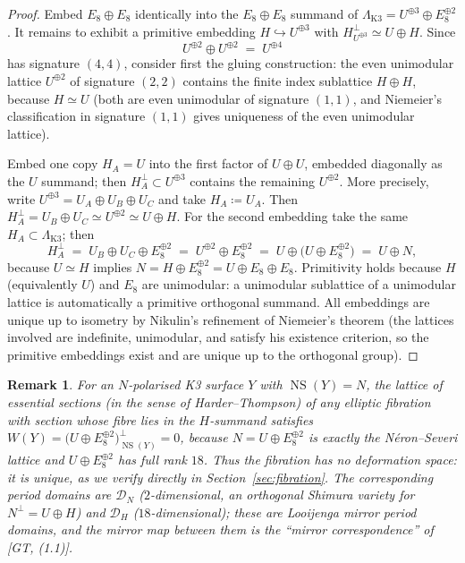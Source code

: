 \documentclass[11pt]{article}
\newtheorem{remark}[theorem]{Remark}
\DeclareMathOperator{\NS}{NS}
\begin{document}
\begin{proof}
Embed $E_8\oplus E_8$ identically into the $E_8\oplus E_8$ summand of
$\Lambda_{\mathrm{K3}}=U^{\oplus3}\oplus E_8^{\oplus2}$. It remains to
exhibit a primitive embedding $H\hookrightarrow U^{\oplus 3}$ with
$H^{\perp}_{U^{\oplus3}}\simeq U\oplus H$. Since
\[
U^{\oplus 2}\oplus U^{\oplus 2}\;=\;U^{\oplus 4}
\]
has signature $(4,4)$, consider first the gluing construction: the even
unimodular lattice $U^{\oplus2}$ of signature $(2,2)$ contains the finite
index sublattice $H\oplus H$, because $H\simeq U$ (both are even unimodular
of signature $(1,1)$, and Niemeier's classification in signature $(1,1)$
gives uniqueness of the even unimodular lattice).


Embed one copy $H_A=U$
into the first factor of $U\oplus U$, embedded diagonally as the $U$
summand; then $H_A^{\perp}\subset U^{\oplus3}$ contains the remaining
$U^{\oplus2}$. More precisely, write
$U^{\oplus3}=U_A\oplus U_B\oplus U_C$ and take
$H_A \coloneqq U_A$. Then
$H_A^{\perp}=U_B\oplus U_C\simeq U^{\oplus2}\simeq U\oplus H$.
For the second embedding take the same $H_A\subset\Lambda_{\mathrm{K3}}$;
then
\[
H_A^{\perp}\;=\;U_B\oplus U_C\oplus E_8^{\oplus2}
\;=\;U^{\oplus 2}\oplus E_8^{\oplus2}
\;=\;U\oplus\bigl(U\oplus E_8^{\oplus 2}\bigr)
\;=\;U\oplus N,
\]
because $U\simeq H$ implies
$N=H\oplus E_8^{\oplus2}=U\oplus E_8\oplus E_8$.
Primitivity holds because $H$ (equivalently $U$) and $E_8$ are unimodular:
a unimodular sublattice of a unimodular lattice is automatically a primitive
orthogonal summand. All embeddings are unique up to isometry by Nikulin's
refinement of Niemeier's theorem (the lattices involved are indefinite,
unimodular, and satisfy his existence criterion, so the primitive embeddings
exist and are unique up to the orthogonal group).
\end{proof}

\begin{remark}\label{rem:W}
For an $N$-polarised K3 surface $Y$ with $\NS(Y)=N$, the lattice of essential
sections (in the sense of Harder--Thompson) of any elliptic fibration with
section whose fibre lies in the $H$-summand satisfies
$W(Y)=\bigl(U\oplus E_8^{\oplus 2}\bigr)^{\perp}_{\NS(Y)}=0$,
because $N=U\oplus E_8^{\oplus2}$ is exactly the N\'eron--Severi lattice and
$U\oplus E_8^{\oplus2}$ has full rank $18$. Thus the fibration has no
deformation space: it is unique, as we verify directly in
Section~\ref{sec:fibration}. The corresponding period domains are
$\mathcal D_N$ ($2$-dimensional, an orthogonal Shimura variety for
$N^{\perp}=U\oplus H$) and $\mathcal D_H$ ($18$-dimensional); these are
Looijenga mirror period domains, and the mirror map between them is the
``mirror correspondence'' of [GT, (1.1)].
\end{remark}
\end{document}
